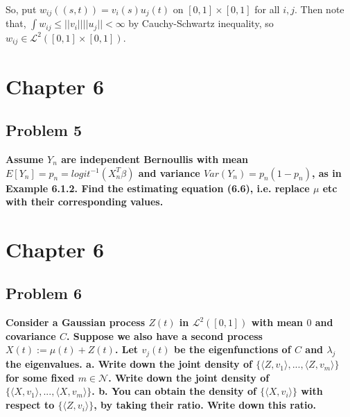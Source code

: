 \documentclass{article}
\begin{document}
So, put $w_{ij}((s,t))=v_i(s)u_j(t)$ on $[0,1]\times[0,1]$ for all $i,j$.
Then note that, $\int{w_{ij}} \leq ||v_i||||u_j||<\infty$ by Cauchy-Schwartz inequality,
so $w_{ij}\in\mathcal{L}^2([0,1]\times[0,1])$.

\section{Chapter 6}
\subsection{Problem 5}
\textbf{
Assume $Y_n$ are independent Bernoullis with mean $E[Y_n]=p_n=logit^{-1}(X_n^T\beta)$ and 
variance $Var(Y_n)=p_n(1-p_n)$, as in Example 6.1.2.
Find the estimating equation (6.6), i.e. replace $\mu$ etc with their corresponding values.
}


\section{Chapter 6}
\subsection{Problem 6}
\textbf{
Consider a Gaussian process $Z(t)$ in $\mathcal{L}^2([0,1])$ with mean $0$ and covariance $C$.
Suppose we also have a second process $X(t):=\mu(t)+Z(t)$.
Let $v_j(t)$ be the eigenfunctions of $C$ and $\lambda_j$ the eigenvalues.
a. Write down the joint density of $\{\langle Z, v_1\rangle,...,\langle Z, v_m\rangle\}$ for some fixed $m\in\mathcal{N}$.
Write down the joint density of $\{\langle X, v_1\rangle,...,\langle X, v_m\rangle\}$.
b. You can obtain the density of $\{\langle X, v_i\rangle\}$ with respect to $\{\langle Z,v_i \rangle\}$,
by taking their ratio. Write down this ratio.
}
\end{document}
